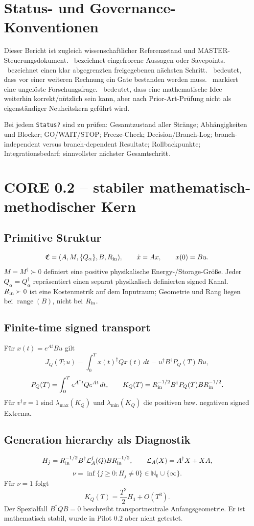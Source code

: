 \section{Status- und Governance-Konventionen}
Dieser Bericht ist zugleich wissenschaftlicher Referenzstand und MASTER-Steuerungsdokument. \STABLE\ bezeichnet eingefrorene Aussagen oder Savepoints. \ACTIVE\ bezeichnet einen klar abgegrenzten freigegebenen nächsten Schritt. \BLOCKED\ bedeutet, dass vor einer weiteren Rechnung ein Gate bestanden werden muss. \OPEN\ markiert eine ungelöste Forschungsfrage. \COLLAPSED\ bedeutet, dass eine mathematische Idee weiterhin korrekt/nützlich sein kann, aber nach Prior-Art-Prüfung nicht als eigenständiger Neuheitskern geführt wird.

Bei jedem \texttt{Status?} sind zu prüfen: Gesamtzustand aller Stränge; Abhängigkeiten und Blocker; GO/WAIT/STOP; Freeze-Check; Decision/Branch-Log; branch-independent versus branch-dependent Resultate; Rollbackpunkte; Integrationsbedarf; sinnvollster nächster Gesamtschritt.

\section{CORE 0.2 -- stabiler mathematisch-methodischer Kern}
\subsection{Primitive Struktur}
\[
\mathfrak C=(A,M,\{Q_\alpha\},B,R_{\rm in}),
\qquad
\dot x=Ax,
\qquad
x(0)=Bu.
\]
$M=M^\dagger\succ0$ definiert eine positive physikalische Energy-/Storage-Größe. Jeder $Q_\alpha=Q_\alpha^\dagger$ repräsentiert einen separat physikalisch definierten signed Kanal. $R_{\rm in}\succ0$ ist eine Kostenmetrik auf dem Inputraum; Geometrie und Rang liegen bei $\operatorname{range}(B)$, nicht bei $R_{\rm in}$.

\subsection{Finite-time signed transport}
Für $x(t)=e^{At}Bu$ gilt
\[
J_Q(T;u)=\int_0^T x(t)^\dagger Qx(t)\,dt
=u^\dagger B^\dagger P_Q(T)Bu,
\]
\[
P_Q(T)=\int_0^T e^{A^\dagger t}Qe^{At}\,dt,
\qquad
K_Q(T)=R_{\rm in}^{-1/2}B^\dagger P_Q(T)BR_{\rm in}^{-1/2}.
\]
Für $v^\dagger v=1$ sind $\lambda_{\max}(K_Q)$ und $\lambda_{\min}(K_Q)$ die positiven bzw. negativen signed Extrema.

\subsection{Generation hierarchy als Diagnostik}
\[
H_j=R_{\rm in}^{-1/2}B^\dagger\mathcal L_A^j(Q)BR_{\rm in}^{-1/2},
\qquad
\mathcal L_A(X)=A^\dagger X+XA,
\]
\[
\nu=\inf\{j\ge0:H_j\neq0\}\in\mathbb N_0\cup\{\infty\}.
\]
Für $\nu=1$ folgt
\[
K_Q(T)=\frac{T^2}{2}H_1+O(T^3).
\]
Der Spezialfall $B^\dagger QB=0$ beschreibt transportneutrale Anfangsgeometrie. Er ist mathematisch stabil, wurde in Pilot 0.2 aber nicht getestet.


